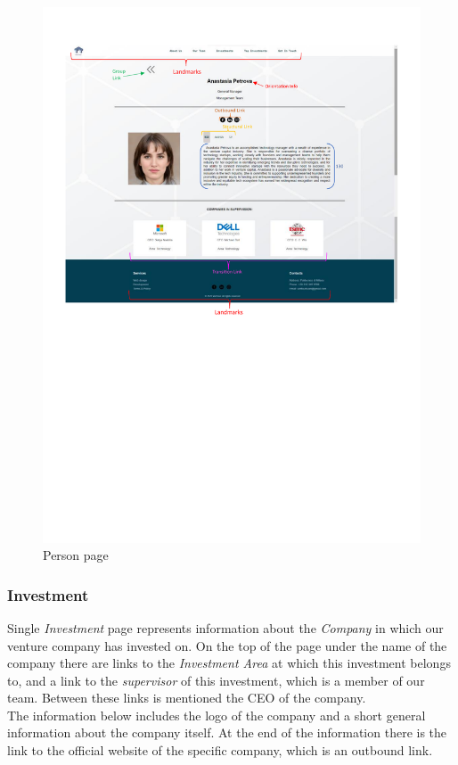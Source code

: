 \documentclass[../../DD.tex]{subfiles}
\begin{document}
    \begin{figure}[!htb]
      \centering
      \includegraphics[width=\textwidth, trim=0 250 0 0, clip]{Images/screenshots/Person_screen.pdf} %
      \caption{Person page}
      \label{fig: Person_screen}
  \end{figure}

	\subsubsection{Investment}
		Single \textit{Investment} page represents information about the \textit{Company} in which our venture company has invested on. 
  On the top of the page under the name of the company there are links to the \textit{Investment Area} at which this investment belongs to, and a link to the \textit{supervisor} of this investment, which is a member of our team. Between these links is mentioned the CEO of the company.\\The information below includes the logo of the company and a short general information about the company itself. At the end of the information there is the link to the official website of the specific company, which is an outbound link.
		\newline



  
\end{document}
